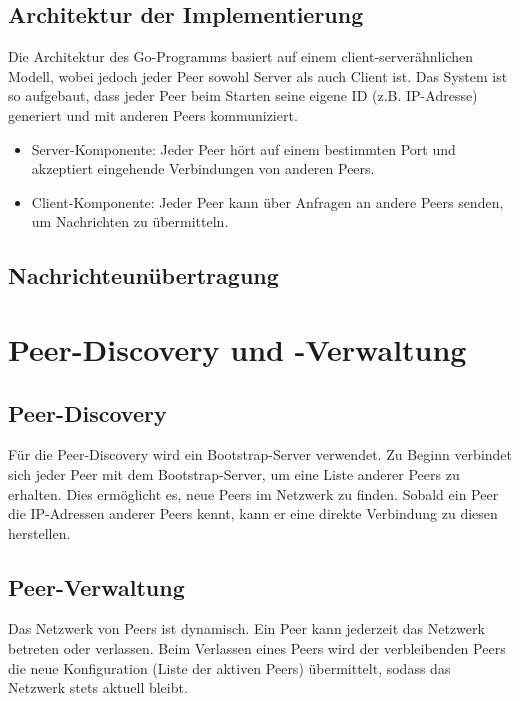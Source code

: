 \subsection{Architektur der Implementierung}

Die Architektur des Go-Programms basiert auf einem client-serverähnlichen Modell, wobei jedoch jeder Peer sowohl Server als auch Client ist. Das System ist so aufgebaut, dass jeder Peer beim Starten seine eigene ID (z.B. IP-Adresse) generiert und mit anderen Peers kommuniziert.

\begin{itemize}
    \item Server-Komponente: Jeder Peer hört auf einem bestimmten Port und akzeptiert eingehende Verbindungen von anderen Peers.
    \item Client-Komponente: Jeder Peer kann über Anfragen an andere Peers senden, um Nachrichten zu übermitteln.
\end{itemize}


\subsection{Nachrichteunübertragung}

\section{Peer-Discovery und -Verwaltung}

\subsection{Peer-Discovery}

Für die Peer-Discovery wird ein Bootstrap-Server verwendet. Zu Beginn verbindet sich jeder Peer mit dem Bootstrap-Server, um eine Liste anderer Peers zu erhalten. Dies ermöglicht es, neue Peers im Netzwerk zu finden. Sobald ein Peer die IP-Adressen anderer Peers kennt, kann er eine direkte Verbindung zu diesen herstellen.

\subsection{Peer-Verwaltung}

Das Netzwerk von Peers ist dynamisch. 
Ein Peer kann jederzeit das Netzwerk betreten oder verlassen. Beim Verlassen eines Peers wird der verbleibenden Peers die neue Konfiguration (Liste der aktiven Peers) übermittelt, sodass das Netzwerk stets aktuell bleibt.


